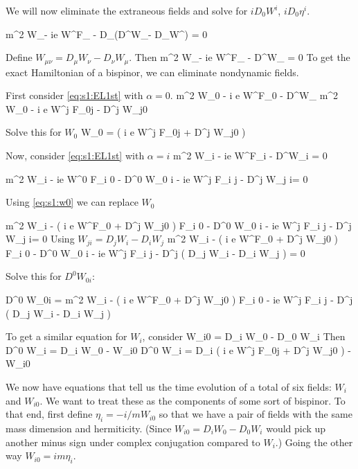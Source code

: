 We will now eliminate the extraneous fields and solve for $iD_0 W^i$, $iD_0 \eta^i$.


\beq 
	m^2 W_\alpha - ie \lambda W^\nu F_{\alpha \nu} - D_\mu (D^\mu W_\alpha - D_\alpha W^\mu) = 0 
\eeq

Define $W_{\mu\nu} = D_\mu W_\nu - D_\nu W_\mu$.  
Then
\beq \label{eq:s1:EL1st}
	m^2 W_\alpha - ie \lambda W^\nu F_{\alpha \nu} - D^\mu W_{\mu \alpha} = 0
\eeq
To get the exact Hamiltonian of a bispinor, we can eliminate nondynamic fields.  

First consider \eqref{eq:s1:EL1st} with $\alpha=0$.
\beq
	m^2 W_0 - i e \lambda W^\nu F_{0\nu} - D^\mu W_{\mu0}
\eeq
\beq
	m^2 W_0 - i e \lambda W^j F_{0j} - D^j W_{j0}
\eeq

Solve this for $W_0$
\beq \label{eq:s1:w0}
	W_0 =  \left( i e \lambda W^j F_{0j} + D^j W_{j0} \right )
\eeq

Now, consider \eqref{eq:s1:EL1st} with $\alpha=i$
\beq
	m^2 W_i - ie \lambda W^\mu F_{i \mu} - D^\mu W_{\mu i} = 0
\eeq

\beq
	m^2 W_i - ie \lambda W^0 F_{i 0} - D^0 W_{0 i} - ie \lambda W^j F_{i j} - D^j W_{j i}= 0
\eeq

Using \eqref{eq:s1:w0} we can replace $W_0$

\beq
	m^2 W_i -  \left( i e \lambda W^\nu F_{0\nu} + D^j W_{j0} \right ) F_{i 0} - D^0 W_{0 i} - ie \lambda W^j F_{i j} - D^j W_{j i}= 0
\eeq
Using $W_{ji} = D_j W_i - D_i W_j$
\beq
	m^2 W_i -  \left( i e \lambda W^\nu F_{0\nu} + D^j W_{j0} \right ) F_{i 0} - D^0 W_{0 i} 
	- ie \lambda W^j F_{i j} - D^j (  D_j W_i - D_i W_j ) = 0
\eeq

Solve this for $D^0 W_{0i}$:

\beq \label{eq:s1:w0i}
	D^0 W_{0i} = m^2 W_i  -  \left( i e \lambda W^\nu F_{0\nu} + D^j W_{j0} \right ) F_{i 0} 
	- ie \lambda W^j F_{i j} - D^j (  D_j W_i - D_i W_j )
\eeq


To get a similar equation for $W_i$, consider
\beq
	W_{i0} = D_i W_0 - D_0 W_i
\eeq
Then
\beq
	D^0 W_i = D_i W_0 - W_{i0}
\eeq
\beq \label{eq:s1:wi}
	D^0 W_i = D_i \left( i e \lambda W^j F_{0j} + D^j W_{j0} \right )  - W_{i0}
\eeq

We now have equations that tell us the time evolution of a total of six fields: $W_i$ and $W_{i0}$.  We want to treat these as the components of some sort of bispinor.  To that end, first define $\eta_i = -i/m W_{i0}$ so that we have a pair of fields with the same mass dimension and hermiticity.  (Since $W_{i0} = D_i W_0 - D_0 W_i$ would pick up another minus sign under complex conjugation compared to $W_i$.)  Going the other way $W_{i0} = im \eta_i$.

